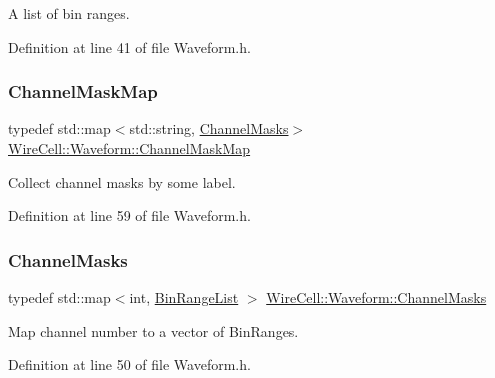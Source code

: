 A list of bin ranges. 



Definition at line 41 of file Waveform.\+h.

\mbox{\label{namespace_wire_cell_1_1_waveform_a18b9ae61c858e340252ba3ac83ac3bc0}} 
\subsubsection{\texorpdfstring{Channel\+Mask\+Map}{ChannelMaskMap}}
{\footnotesize\ttfamily typedef std\+::map$<$std\+::string, \hyperlink{namespace_wire_cell_1_1_waveform_a3d2f1baf84b749d139533ebd4d4da3f0}{Channel\+Masks}$>$ \hyperlink{namespace_wire_cell_1_1_waveform_a18b9ae61c858e340252ba3ac83ac3bc0}{Wire\+Cell\+::\+Waveform\+::\+Channel\+Mask\+Map}}



Collect channel masks by some label. 



Definition at line 59 of file Waveform.\+h.

\mbox{\label{namespace_wire_cell_1_1_waveform_a3d2f1baf84b749d139533ebd4d4da3f0}} 
\subsubsection{\texorpdfstring{Channel\+Masks}{ChannelMasks}}
{\footnotesize\ttfamily typedef std\+::map$<$int, \hyperlink{namespace_wire_cell_1_1_waveform_ae9e850f13cd7f9cbcc309a5d7dd2fd37}{Bin\+Range\+List} $>$ \hyperlink{namespace_wire_cell_1_1_waveform_a3d2f1baf84b749d139533ebd4d4da3f0}{Wire\+Cell\+::\+Waveform\+::\+Channel\+Masks}}



Map channel number to a vector of Bin\+Ranges. 



Definition at line 50 of file Waveform.\+h.

\mbox{\label{namespace_wire_cell_1_1_waveform_a4a69305e16ea32b03030a13a52478c38}} 
